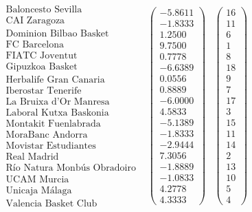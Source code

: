 \[
\begin{array}{ccc}
\begin{array}{c}
\text{Baloncesto Sevilla}\\
\text{CAI Zaragoza} \\
\text{Dominion Bilbao Basket} \\
\text{FC Barcelona} \\
\text{FIATC Joventut} \\
\text{Gipuzkoa Basket} \\
\text{Herbalife Gran Canaria} \\
\text{Iberostar Tenerife} \\
\text{La Bruixa d'Or Manresa} \\
\text{Laboral Kutxa Baskonia} \\
\text{Montakit Fuenlabrada} \\
\text{MoraBanc Andorra} \\
\text{Movistar Estudiantes} \\
\text{Real Madrid} \\
\text{Río Natura Monbús Obradoiro} \\
\text{UCAM Murcia} \\
\text{Unicaja Málaga} \\
\text{Valencia Basket Club}
\end{array} & \left(\begin{array}{c}
   -5.8611\\
   -1.8333\\
   1.2500\\
   9.7500\\
   0.7778\\
   -6.6389\\
   0.0556\\
   0.8889\\
   -6.0000\\
   4.5833\\
   -5.1389\\
   -1.8333\\
   -2.9444\\
   7.3056\\
   -1.8889\\
   -1.0833\\
   4.2778\\
   4.3333
\end{array} \right) & \left(\begin{array}{c}
16\\
11\\
6\\
1\\
8\\
18\\
9\\
7\\
17\\
3\\
15\\
11\\
14\\
2\\
13\\
10\\
5\\
4
\end{array} \right) 
\end{array}  
\]
